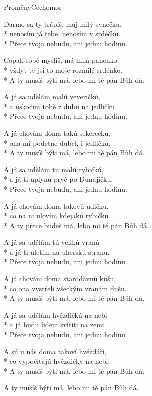 \documentclass[10.5pt]{book}
\begin{document}
\begin{poem}{Proměny}{Čechomor}

\settowidth{\versewidth}{A ty přece budeš má, lebo mi tě pán Bůh dá.}

Darmo sa ty trápíš, můj milý synečku,\\*
nenosím já tebe, nenosím v srdéčku.\\*
Přece tvoja nebudu, ani jednu hodinu.

Copak sobě myslíš, má milá panenko,\\*
vždyť ty jsi to moje rozmilé srdénko.\\*
A ty musíš býti má, lebo mi tě pán Bůh dá.

A já sa udělám malú veveričkú,\\*
a uskočím tobě z dubu na jedličku.\\*
Přece tvoja nebudu, ani jednu hodinu.

A já chovám doma takú sekerečku,\\*
ona mi podetne důbek i jedličku.\\*
A ty musíš býti má, lebo mi tě pán Bůh dá.

A já sa udělám tu malú rybičkú,\\*
a já ti uplynu pryč po Dunajíčku.\\*
Přece tvoja nebudu, ani jednu hodinu.

A já chovám doma takovú udičku,\\*
co na ni ulovím kdejakú rybičku.\\*
A ty přece budeš má, lebo mi tě pán Bůh dá.

A já sa udělám tú velikú vranú\\*
a já ti uletím na uherskú stranu.\\*
Přece tvoja nebudu, ani jednu hodinu.

A já chovám doma starodávnú kušu,\\*
co ona vystřelí všeckým vranám dušu.\\*
A ty musíš býti má, lebo mi tě pán Bůh dá.

A já sa udělám hvězdičkú na nebi\\*
a já budu lidem svítiti na zemi.\\*
Přece tvoja nebudu, ani jednu hodinu.

A sú u nás doma takoví hvězdáři,\\*
co vypočítajú hvězdičky na nebi.\\*
A ty musíš býti má, lebo mi tě pán Bůh dá.

A ty musíš býti má, lebo mi tě pán Bůh dá.

\end{poem}
\end{document}
